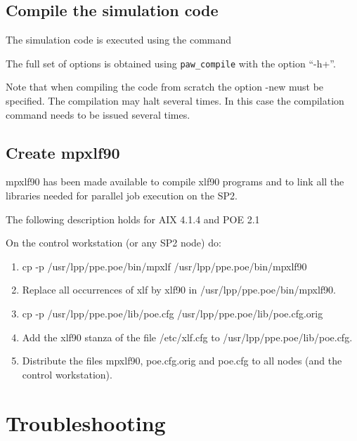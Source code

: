 \documentclass[final,12pt]{article}
\begin{document}
\subsection{Compile the simulation code}

The simulation code is executed using the command

\bigskip{}\bigskip

\noindent The full set of options is obtained using {\tt paw\_compile} with
the option ``-h+''.

Note that when compiling the code from scratch the option -new must be
specified. The compilation may halt several times. In this
case the compilation command needs to be issued several times.

\subsection{Create mpxlf90}

mpxlf90 has been made available to compile xlf90 programs and to link
all the libraries needed for parallel job execution on the SP2.

The following description holds for AIX 4.1.4 and POE 2.1

On the control workstation (or any SP2 node) do:

\begin{enumerate}
\item cp -p /usr/lpp/ppe.poe/bin/mpxlf  /usr/lpp/ppe.poe/bin/mpxlf90
\item Replace all occurrences of xlf by xlf90 in
   /usr/lpp/ppe.poe/bin/mpxlf90.
\item cp -p /usr/lpp/ppe.poe/lib/poe.cfg /usr/lpp/ppe.poe/lib/poe.cfg.orig
\item Add the xlf90 stanza of the file /etc/xlf.cfg to
   /usr/lpp/ppe.poe/lib/poe.cfg.
\item Distribute the files mpxlf90, poe.cfg.orig and poe.cfg to all nodes
   (and the control workstation).
\end{enumerate}

\section{Troubleshooting}
\end{document}
